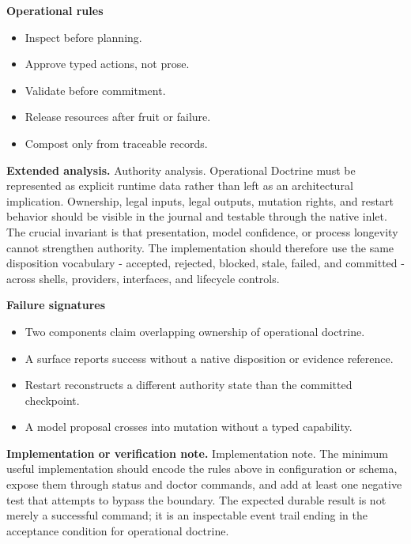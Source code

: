 \documentclass[10pt,letterpaper,oneside]{article}
\begin{document}
\textbf{Operational rules}
\begin{itemize}
\item Inspect before planning.
\item Approve typed actions, not prose.
\item Validate before commitment.
\item Release resources after fruit or failure.
\item Compost only from traceable records.
\end{itemize}
\textbf{Extended analysis.} Authority analysis. Operational Doctrine must be represented as explicit runtime data rather than left as an architectural implication. Ownership, legal inputs, legal outputs, mutation rights, and restart behavior should be visible in the journal and testable through the native inlet. The crucial invariant is that presentation, model confidence, or process longevity cannot strengthen authority. The implementation should therefore use the same disposition vocabulary - accepted, rejected, blocked, stale, failed, and committed - across shells, providers, interfaces, and lifecycle controls.

\textbf{Failure signatures}
\begin{itemize}
\item Two components claim overlapping ownership of operational doctrine.
\item A surface reports success without a native disposition or evidence reference.
\item Restart reconstructs a different authority state than the committed checkpoint.
\item A model proposal crosses into mutation without a typed capability.
\end{itemize}
\textbf{Implementation or verification note.} Implementation note. The minimum useful implementation should encode the rules above in configuration or schema, expose them through status and doctor commands, and add at least one negative test that attempts to bypass the boundary. The expected durable result is not merely a successful command; it is an inspectable event trail ending in the acceptance condition for operational doctrine.
\end{document}

